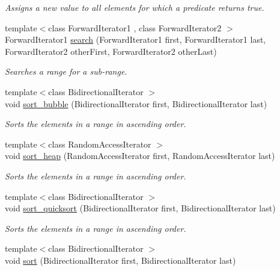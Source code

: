 \begin{DoxyCompactItemize}
\begin{DoxyCompactList}\small\item\em Assigns a new value to all elements for which a predicate returns true. \end{DoxyCompactList}\item 
{\footnotesize template$<$class Forward\+Iterator1 , class Forward\+Iterator2 $>$ }\\Forward\+Iterator1 \hyperlink{namespaceprism_a03dbb806369b062fd90909fd826c2ee4}{search} (Forward\+Iterator1 first, Forward\+Iterator1 last, Forward\+Iterator2 other\+First, Forward\+Iterator2 other\+Last)
\begin{DoxyCompactList}\small\item\em Searches a range for a sub-\/range. \end{DoxyCompactList}\item 
{\footnotesize template$<$class Bidirectional\+Iterator $>$ }\\void \hyperlink{namespaceprism_aa2955433bd872919cf59580c1a464c93}{sort\+\_\+bubble} (Bidirectional\+Iterator first, Bidirectional\+Iterator last)
\begin{DoxyCompactList}\small\item\em Sorts the elements in a range in ascending order. \end{DoxyCompactList}\item 
{\footnotesize template$<$class Random\+Access\+Iterator $>$ }\\void \hyperlink{namespaceprism_a1e9fe74c5dcee70bf5dd5c89f1234a02}{sort\+\_\+heap} (Random\+Access\+Iterator first, Random\+Access\+Iterator last)
\begin{DoxyCompactList}\small\item\em Sorts the elements in a range in ascending order. \end{DoxyCompactList}\item 
{\footnotesize template$<$class Bidirectional\+Iterator $>$ }\\void \hyperlink{namespaceprism_ad8cbe49b782032932d0da83860e7b368}{sort\+\_\+quicksort} (Bidirectional\+Iterator first, Bidirectional\+Iterator last)
\begin{DoxyCompactList}\small\item\em Sorts the elements in a range in ascending order. \end{DoxyCompactList}\item 
{\footnotesize template$<$class Bidirectional\+Iterator $>$ }\\void \hyperlink{namespaceprism_addfe9ea0146b59b2b16adee4cd2220b9}{sort} (Bidirectional\+Iterator first, Bidirectional\+Iterator last)

\end{DoxyCompactItemize}

